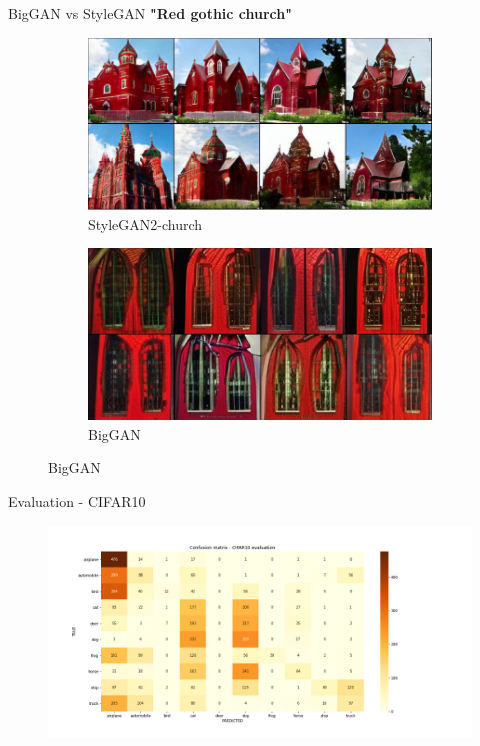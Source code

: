 \documentclass[t]{beamer}
\begin{document}
\begin{frame}[c]{BigGAN vs StyleGAN}
\centering
\textbf{"Red gothic church"}
\begin{figure}[H]
\centering
\begin{subfigure}[b]{0.5\textwidth}
   \includegraphics[width=1\linewidth, scale=0.15]{redgothic_stylegan.PNG}
   \caption{StyleGAN2-church}
   \label{fig:Ng1} 
\end{subfigure}
\begin{subfigure}[b]{0.5\textwidth}
   \includegraphics[width=1\linewidth, scale=0.15]{redgothic_biggan.PNG}
   \caption{BigGAN}
   \label{fig:Ng2}
\end{subfigure}
\end{figure}
\end{frame}

\begin{frame}[c]{Evaluation - CIFAR10}
\begin{figure}
    \centering
    \includegraphics[scale=0.3]{confusion_matrix.png}
\end{figure} 
\end{frame}
\end{document}
